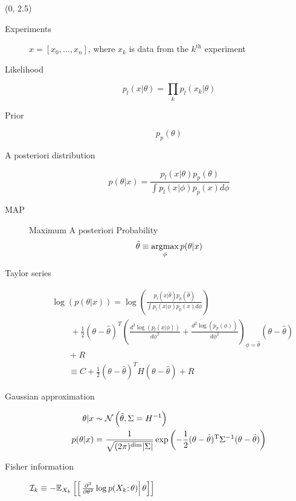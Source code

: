 \documentclass[a0]{a0poster}
\begin{document}
\begin{textblock}{6}(0, 2.5)
  \begin{description}
  \item[Experiments] $x=[x_0,\ldots,x_n]$, where $x_k$ is data from
    the $k^\text{th}$ experiment
  \item[Likelihood]
    \begin{equation*}
      p_l(x|\theta) = \prod_k p_l(x_k|\theta)
    \end{equation*}
  \item[Prior]
    \begin{equation*}
      p_p(\theta)
    \end{equation*}
  \item[A posteriori distribution]
    \begin{equation*}
      p(\theta|x) = \frac{p_l(x|\theta) p_p(\theta)}{\int p_l(x|\phi)
        p_p(x) d\phi}
    \end{equation*}
  \item[MAP] Maximum A posteriori Probability
    \begin{equation*}
      \hat \theta \equiv \operatorname*{argmax}_{\phi} p(\theta|x)
    \end{equation*}
  \item[Taylor series]
    \begin{align*}
      &\log \left( p(\theta|x) \right) = \log \left( \frac{p_l(x|\hat \theta)
        p_p(\hat \theta)}{\int p_l(x|\phi) p_p(x) d\phi} \right) \\
      &\qquad~+ \frac{1}{2}
        \left( \theta - \hat \theta \right)^T \left(
        \frac{d^2 \log\left( p_l(x|\phi) \right) }{d\phi^2} +
        \frac{d^2 \log \left( p_p(\phi) \right) }{d\phi^2} 
        \right)_{\phi=\hat \theta} \left( \theta - \hat \theta
        \right)\\
      &\qquad + R \\
      &\qquad\equiv C + \frac{1}{2}
        \left( \theta - \hat \theta \right)^T H \left( \theta - \hat \theta \right)
        + R
    \end{align*}
  \item[Gaussian approximation]
    \begin{align*}
      \theta|x &\sim {{\cal N}\left( \hat \theta,\Sigma = H^{-1} \right)}\\
      p(\theta|x) &= \frac{1}{\sqrt{(2\pi)^{\text{dim}}|\Sigma|}} \exp\left(
                    -\frac{1}{2}(\theta-\hat\theta)^\mathrm{T}\Sigma^{-1}
                    (\theta-\hat\theta) \right)
    \end{align*}
  \item[Fisher information]
    $\mathcal{I}_k \equiv -
    \mathbb{E}_{X_k}\left[\left[\left. \frac{\partial^2}{\partial\theta^2} \log
          p(X_k;\theta)\right|\theta \right]\right]$
  \end{description}


\end{textblock}
\end{document}
